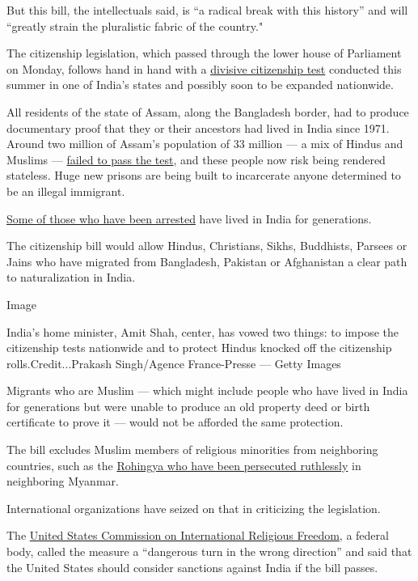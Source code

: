 But this bill, the intellectuals said, is ``a radical break with this
history'' and will ``greatly strain the pluralistic fabric of the
country."

The citizenship legislation, which passed through the lower house of
Parliament on Monday, follows hand in hand with a
\href{https://www.nytimes.com/2019/08/17/world/asia/india-muslims-narendra-modi.html}{divisive
citizenship test} conducted this summer in one of India's states and
possibly soon to be expanded nationwide.

All residents of the state of Assam, along the Bangladesh border, had to
produce documentary proof that they or their ancestors had lived in
India since 1971. Around two million of Assam's population of 33 million
--- a mix of Hindus and Muslims ---
\href{https://www.nytimes.com/2019/08/31/world/asia/india-muslim-citizen-list.html}{failed
to pass the test}, and these people now risk being rendered stateless.
Huge new prisons are being built to incarcerate anyone determined to be
an illegal immigrant.

\href{https://timesofindia.indiatimes.com/india/ex-armyman-working-as-cop-in-assam-declared-foreigner/articleshow/69569675.cms}{Some
of those who have been arrested} have lived in India for generations.

The citizenship bill would allow Hindus, Christians, Sikhs, Buddhists,
Parsees or Jains who have migrated from Bangladesh, Pakistan or
Afghanistan a clear path to naturalization in India.

Image

India's home minister, Amit Shah, center, has vowed two things: to
impose the citizenship tests nationwide and to protect Hindus knocked
off the citizenship rolls.Credit...Prakash Singh/Agence France-Presse
--- Getty Images

Migrants who are Muslim --- which might include people who have lived in
India for generations but were unable to produce an old property deed or
birth certificate to prove it --- would not be afforded the same
protection.

The bill excludes Muslim members of religious minorities from
neighboring countries, such as the
\href{https://www.nytimes.com/2017/10/11/world/asia/rohingya-myanmar-atrocities.html}{Rohingya
who have been persecuted ruthlessly} in neighboring Myanmar.

International organizations have seized on that in criticizing the
legislation.

The
\href{https://www.uscirf.gov/news-room/press-releases-statements/uscirf-raises-serious-concerns-and-eyes-sanctions}{United
States Commission on International Religious Freedom}, a federal body,
called the measure a ``dangerous turn in the wrong direction'' and said
that the United States should consider sanctions against India if the
bill passes.

